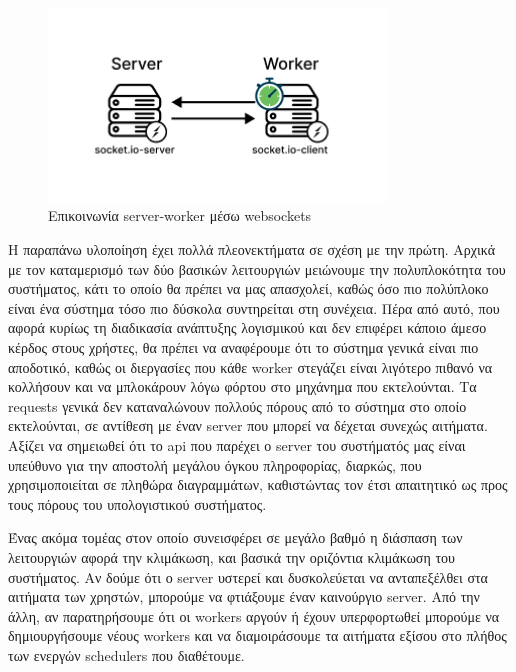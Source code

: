 \begin{figure}[!ht]
	\centering
	\includegraphics[width=0.8\textwidth]{./images/chapter4/socket.io-communication.png}
	\caption[Επικοινωνία server-worker μέσω websockets]{Επικοινωνία server-worker μέσω websockets}
	\label{fig:socketio-communitation}
\end{figure}

Η παραπάνω υλοποίηση έχει πολλά πλεονεκτήματα σε σχέση με την πρώτη. Αρχικά με τον καταμερισμό
των δύο βασικών λειτουργιών μειώνουμε την πολυπλοκότητα του συστήματος, κάτι το οποίο θα πρέπει να μας απασχολεί,
καθώς όσο πιο πολύπλοκο είναι ένα σύστημα τόσο πιο δύσκολα συντηρείται στη συνέχεια. Πέρα από αυτό, που αφορά
κυρίως τη διαδικασία ανάπτυξης λογισμικού και δεν επιφέρει κάποιο άμεσο κέρδος στους χρήστες, θα πρέπει να αναφέρουμε
ότι το σύστημα γενικά είναι πιο αποδοτικό, καθώς οι διεργασίες που κάθε worker στεγάζει είναι λιγότερο πιθανό να
κολλήσουν και να μπλοκάρουν λόγω φόρτου στο μηχάνημα που εκτελούνται. Τα requests γενικά δεν καταναλώνουν πολλούς πόρους από το σύστημα στο οποίο εκτελούνται,
σε αντίθεση με έναν server που μπορεί να δέχεται συνεχώς αιτήματα. Αξίζει να σημειωθεί ότι το api που παρέχει ο server του συστήματός μας είναι υπεύθυνο
για την αποστολή μεγάλου όγκου πληροφορίας, διαρκώς, που χρησιμοποιείται σε πληθώρα διαγραμμάτων, καθιστώντας τον έτσι απαιτητικό ως προς τους πόρους του
υπολογιστικού συστήματος.

Ένας ακόμα τομέας στον οποίο συνεισφέρει σε μεγάλο βαθμό η διάσπαση των λειτουργιών αφορά την κλιμάκωση, και βασικά την οριζόντια κλιμάκωση
του συστήματος. Αν δούμε ότι ο server υστερεί και δυσκολεύεται να ανταπεξέλθει στα αιτήματα των χρηστών,
μπορούμε να φτιάξουμε έναν καινούργιο server. Από την άλλη, αν παρατηρήσουμε ότι οι workers αργούν ή έχουν υπερφορτωθεί
μπορούμε να δημιουργήσουμε νέους workers και να διαμοιράσουμε τα αιτήματα εξίσου στο πλήθος των ενεργών schedulers που διαθέτουμε.

